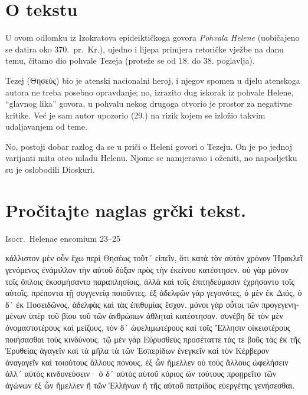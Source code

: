 
\section*{O tekstu}

U ovom odlomku iz Izokratova epideiktičkoga govora \textit{Pohvala Helene} (uobičajeno se datira oko 370.\ pr.~Kr.), ujedno i lijepa primjera retoričke vježbe na danu temu, čitamo dio pohvale Tezeja (proteže se od 18. do 38. poglavlja). 

Tezej (Θησεύς) bio je atenski nacionalni heroj, i njegov spomen u djelu atenskoga autora ne treba posebno opravdanje; no, izrazito dug iskorak iz pohvale Helene, ``glavnog lika'' govora, u pohvalu nekog drugoga otvorio je prostor za negativne kritike. Već je sam autor upozorio (29.) na rizik kojem se izložio takvim udaljavanjem od teme.
 
No, postoji dobar razlog da se u priči o Heleni govori o Tezeju. On je po jednoj varijanti mita oteo mladu Helenu.  Njome se namjeravao i oženiti, no naposljetku su je oslobodili Dioskuri.


\section*{Pročitajte naglas grčki tekst.}

Isocr.\ Helenae encomium 23–25


\medskip


{\large

\begin{greek}

\noindent κάλλιστον μὲν οὖν ἔχω περὶ Θησέως τοῦτ´ εἰπεῖν, ὅτι κατὰ τὸν αὐτὸν χρόνον Ἡρακλεῖ γενόμενος ἐνάμιλλον τὴν αὑτοῦ δόξαν πρὸς τὴν ἐκείνου κατέστησεν. οὐ γὰρ μόνον τοῖς ὅπλοις ἐκοσμήσαντο παραπλησίοις, ἀλλὰ καὶ τοῖς ἐπιτηδεύμασιν ἐχρήσαντο τοῖς αὐτοῖς, πρέποντα τῇ συγγενείᾳ ποιοῦντες. ἐξ ἀδελφῶν γὰρ γεγονότες, ὁ μὲν ἐκ Διός, ὁ δ´ ἐκ Ποσειδῶνος, ἀδελφὰς καὶ τὰς ἐπιθυμίας ἔσχον. μόνοι γὰρ οὗτοι τῶν προγεγενημένων ὑπὲρ τοῦ βίου τοῦ τῶν ἀνθρώπων ἀθληταὶ κατέστησαν. συνέβη δὲ τὸν μὲν ὀνομαστοτέρους καὶ μείζους, τὸν δ´ ὠφελιμωτέρους καὶ τοῖς Ἕλλησιν οἰκειοτέρους ποιήσασθαι τοὺς κινδύνους. τῷ μὲν γὰρ Εὐρυσθεὺς προσέταττε τάς τε βοῦς τὰς ἐκ τῆς Ἐρυθείας ἀγαγεῖν καὶ τὰ μῆλα τὰ τῶν Ἑσπερίδων ἐνεγκεῖν καὶ τὸν Κέρβερον ἀναγαγεῖν καὶ τοιούτους ἄλλους πόνους, ἐξ ὧν ἤμελλεν οὐ τοὺς ἄλλους ὠφελήσειν ἀλλ´ αὐτὸς κινδυνεύσειν· ὁ δ´ αὐτὸς αὑτοῦ κύριος ὢν τούτους προῃρεῖτο τῶν ἀγώνων ἐξ ὧν ἤμελλεν ἢ τῶν Ἑλλήνων ἢ τῆς αὑτοῦ πατρίδος εὐεργέτης γενήσεσθαι.

\end{greek}

}


